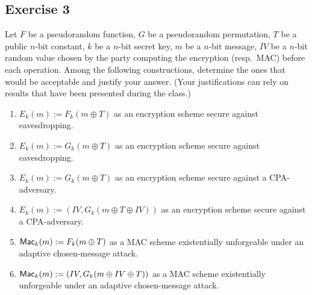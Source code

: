 \subsection{Exercise 3}
Let $F$ be a pseudorandom function, $G$ be a pseudorandom permutation, $T$ be a public $n$-bit constant, $k$ be a $n$-bit secret key, $m$ be a $n$-bit message, $IV$ be a $n$-bit random value chosen by the party computing the encryption (resp.~MAC) before each operation. Among the following constructions, determine the ones that would be acceptable and justify your answer. (Your justifications can rely on results that have been presented during the class.)

\begin{enumerate}
	\item $E_k(m):=F_k(m \oplus T)$ as an encryption scheme secure against
	eavesdropping.

	\item $E_k(m):=G_k(m \oplus T)$ as an encryption scheme secure against eavesdropping.
	
	\item $E_k(m):=G_k(m \oplus T)$ as an encryption scheme secure against a CPA-adversary.
	
	\item $E_k(m):=(IV,G_k(m \oplus T \oplus IV))$ as an encryption scheme secure against a CPA-adversary.

	\item $\operatorname{\mathsf{Mac}}_k(m):=F_k(m \oplus T)$ as a MAC scheme existentially unforgeable under an
	adaptive chosen-message attack.
	
	\item $\operatorname{\mathsf{Mac}}_k(m):=(IV,G_k(m\oplus IV \oplus T))$ as a MAC scheme
	existentially unforgeable under an adaptive chosen-message attack.
	
\end{enumerate}
